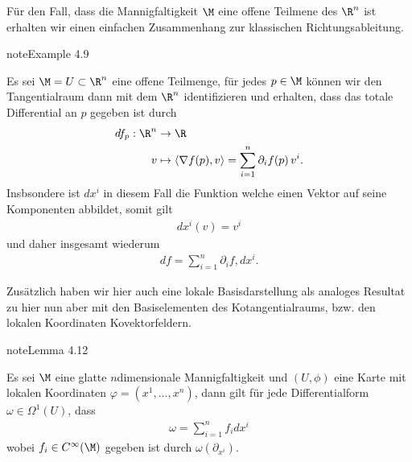 \documentclass[letterpaper,10pt,english]{jupyterBook}
\begin{document}
\sphinxAtStartPar
Für den Fall, dass die Mannigfaltigkeit \(\M\) eine offene Teilmene des \(\R^n\) ist erhalten wir einen einfachen Zusammenhang zur klassischen Richtungsableitung.
\label{manifolds/tangential:example-40}
\begin{sphinxadmonition}{note}{Example 4.9}



\sphinxAtStartPar
Es sei \(\M=U\subset\R^n\) eine offene Teilmenge, für jedes \(p\in\M\) können wir den Tangentialraum dann mit dem \(\R^n\) identifizieren und erhalten, dass das totale Differential an \(p\) gegeben ist durch
\begin{equation*}
\begin{split}df_p:\R^n&\to\R\\
v&\mapsto \langle \nabla f(p), v \rangle = \sum_{i=1}^n \partial_i f(p)\, v^i.\end{split}
\end{equation*}
\sphinxAtStartPar
Insbsondere ist \(dx^{i}\) in diesem Fall die Funktion welche einen Vektor auf seine Komponenten abbildet, somit gilt
\begin{equation*}
\begin{split}dx^{i}(v) = v^i\end{split}
\end{equation*}
\sphinxAtStartPar
und daher insgesamt wiederum
\begin{equation*}
\begin{split}df = \sum_{i=1}^n \partial_i f, dx^{i}.\end{split}
\end{equation*}\end{sphinxadmonition}

\sphinxAtStartPar
Zusätzlich haben wir hier auch eine lokale Basisdarstellung als analoges Resultat zu {\hyperref[\detokenize{manifolds/tangential:lem:localsections}]{}} hier nun aber mit den Basiselementen des Kotangentialraums, bzw. den lokalen Koordinaten Kovektorfeldern.
\label{manifolds/tangential:lem:coordcovec}
\begin{sphinxadmonition}{note}{Lemma 4.12}



\sphinxAtStartPar
Es sei \(\M\) eine glatte \(n\)\sphinxhyphen{}dimensionale Mannigfaltigkeit und \((U,\phi)\) eine Karte mit lokalen Koordinaten \(\varphi=(x^1,\ldots, x^n)\),  dann gilt für jede Differentialform \(\omega\in\Omega^1(U)\), dass
\begin{equation*}
\begin{split}\omega = \sum_{i=1}^n f_i dx^i\end{split}
\end{equation*}
\sphinxAtStartPar
wobei \(f_i\in C^\infty(\M)\) gegeben ist durch \(\omega(\partial_{x^i})\).
\end{sphinxadmonition}
\end{document}
